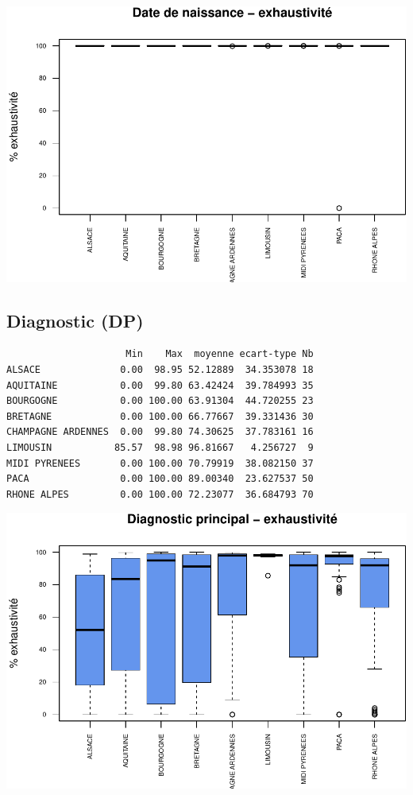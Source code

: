 \documentclass[]{article}
\begin{document}
\includegraphics{septembre2015_files/figure-latex/unnamed-chunk-28-1.pdf}

\subsection{Diagnostic (DP)}\label{diagnostic-dp-2}

\begin{verbatim}
                     Min    Max  moyenne ecart-type Nb
ALSACE              0.00  98.95 52.12889  34.353078 18
AQUITAINE           0.00  99.80 63.42424  39.784993 35
BOURGOGNE           0.00 100.00 63.91304  44.720255 23
BRETAGNE            0.00 100.00 66.77667  39.331436 30
CHAMPAGNE ARDENNES  0.00  99.80 74.30625  37.783161 16
LIMOUSIN           85.57  98.98 96.81667   4.256727  9
MIDI PYRENEES       0.00 100.00 70.79919  38.082150 37
PACA                0.00 100.00 89.00340  23.627537 50
RHONE ALPES         0.00 100.00 72.23077  36.684793 70
\end{verbatim}

\includegraphics{septembre2015_files/figure-latex/unnamed-chunk-29-1.pdf}
\end{document}
